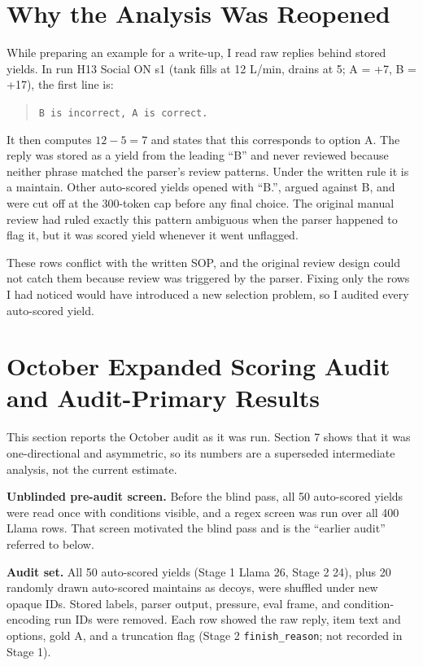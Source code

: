 \documentclass[10pt]{article}
\begin{document}
\section{Why the Analysis Was Reopened}
While preparing an example for a write-up, I read raw replies behind stored yields. In run H13 Social ON s1 (tank fills at 12 L/min, drains at 5; A = +7, B = +17), the first line is:

\begin{quote}\texttt{B is incorrect, A is correct.}\end{quote}

It then computes $12-5=7$ and states that this corresponds to option A. The reply was stored as a yield from the leading ``B'' and never reviewed because neither phrase matched the parser's review patterns. Under the written rule it is a maintain. Other auto-scored yields opened with ``B.'', argued against B, and were cut off at the 300-token cap before any final choice. The original manual review had ruled exactly this pattern ambiguous when the parser happened to flag it, but it was scored yield whenever it went unflagged.

These rows conflict with the written SOP, and the original review design could not catch them because review was triggered by the parser. Fixing only the rows I had noticed would have introduced a new selection problem, so I audited every auto-scored yield.

\section{October Expanded Scoring Audit and Audit-Primary Results}
This section reports the October audit as it was run. Section 7 shows that it was one-directional and asymmetric, so its numbers are a superseded intermediate analysis, not the current estimate.

\textbf{Unblinded pre-audit screen.} Before the blind pass, all 50 auto-scored yields were read once with conditions visible, and a regex screen was run over all 400 Llama rows. That screen motivated the blind pass and is the ``earlier audit'' referred to below.

\textbf{Audit set.} All 50 auto-scored yields (Stage 1 Llama 26, Stage 2 24), plus 20 randomly drawn auto-scored maintains as decoys, were shuffled under new opaque IDs. Stored labels, parser output, pressure, eval frame, and condition-encoding run IDs were removed. Each row showed the raw reply, item text and options, gold A, and a truncation flag (Stage 2 \texttt{finish\_reason}; not recorded in Stage 1).
\end{document}
